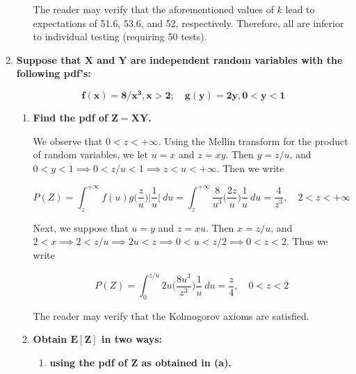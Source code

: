 \documentclass[10pt, oneside]{article}   	%
\theoremstyle{definition}
\begin{document}
\begin{enumerate}[label=7.\arabic*]
\begin{enumerate}
	The reader may verify that the aforementioned values of $k$ lead to expectations of 51.6, 53.6, and 52, respectively. Therefore, all are inferior to individual testing (requiring 50 tests).
	\end{enumerate}

\item  \begin{tcolorbox}[
  colback=Cerulean!5!white,
  colframe=Cerulean!75!black]
  \textbf{Suppose that $\bm{X}$ and $\bm{Y}$ are independent random variables with the following pdf's:}
  
  \[ \bm{f(x) = 8/x^3, x > 2; \quad g(y) = 2y, 0 < y < 1} \]
\end{tcolorbox}

	\begin{enumerate}
	\item  \begin{tcolorbox}[
	  colback=Cerulean!5!white,
	  colframe=Cerulean!75!black]
	\textbf{Find the pdf of $\bm{Z = XY}$.}
	\end{tcolorbox}
	
	We observe that $0 < z < +\infty$. Using the Mellin transform for the product of random variables, we let $u = x$ and $z = xy$. Then $y = z/u$, and $0 < y < 1  \implies 0 < z/u < 1 \implies z < u < + \infty$. Then we write
	
	\[ P(Z) = \int^{+\infty}_{z} f(u) g \Big( \frac{z}{u} \Big) \Big| \frac{1}{u} \Big| \ du = \int^{+\infty}_{z} \frac{8}{u^3} \Big( \frac{2z}{u} \Big) \frac{1}{u} \ du = \boxed{ \frac{4}{z^3}, \quad 2 < z < +\infty} \]
	
	Next, we suppose that $u = y$ and $z = xu$. Then $x = z/u$, and $2 < x \implies 2 < z/u \implies 2u < z \implies 0 < u < z/2 \implies 0 < z < 2$. Thus we write
	
	\[ P(Z) = \int^{z/u}_0 2u \Big( \frac{8u^3}{z^3} \Big) \frac{1}{u} \ du = \boxed{\frac{z}{4}, \quad 0 < z < 2} \]
	
	The reader may verify that the Kolmogorov axioms are satisfied.
	
	\item  \begin{tcolorbox}[
	  colback=Cerulean!5!white,
	  colframe=Cerulean!75!black]
	\textbf{Obtain $\bm{E[Z]}$ in two ways:}
	\end{tcolorbox}
	
		\begin{enumerate}
		\item  \begin{tcolorbox}[
		  colback=Cerulean!5!white,
		  colframe=Cerulean!75!black]
		\textbf{using the pdf of $\bm{Z}$ as obtained in (a).}
		\end{tcolorbox}
		

\end{enumerate}
\end{enumerate}
\end{enumerate}
\end{document}
